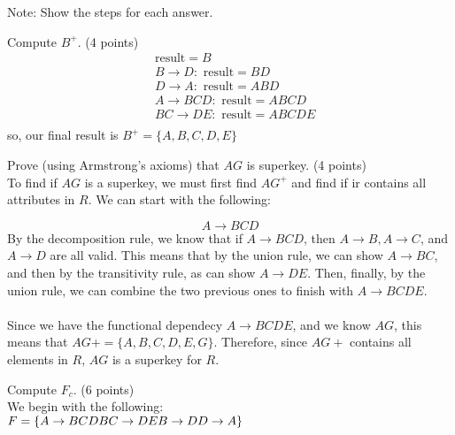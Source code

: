 \documentclass[a4 paper]{article}
\begin{document}
\noindent Note: Show the steps for each answer.

 Compute $B^{+}$. \indent (4 points)\\
\begin{align*}
  &\text{result} = B\\
  &B\rightarrow D: \text{ result} = BD\\
  &D\rightarrow A: \text{ result} = ABD\\
  &A\rightarrow BCD: \text{ result} = ABCD\\
  &BC\rightarrow DE: \text{ result} = ABCDE\\
\end{align*}
so, our final result is $B^+=\{A,B,C,D,E\}$




 Prove (using Armstrong's axioms) that $AG$ is superkey. \indent (4 points)\\
To find if $AG$ is a superkey, we must first find $AG^+$ and find if ir contains all attributes in $R$. We can start with the following:

$$A\rightarrow BCD$$
By the decomposition rule, we know that if $A\rightarrow BCD$, then $A\rightarrow B, A\rightarrow C$, and $A\rightarrow D$ are all valid. This means that by the union rule, we can show $A\rightarrow BC$, and then by the transitivity rule, as can show $A\rightarrow DE$. Then, finally, by the union rule, we can combine the two previous ones to finish with $A\rightarrow BCDE$.\\\\
Since we have the functional dependecy $A\rightarrow BCDE$, and we know $AG$, this means that $AG+=\{A, B, C, D, E, G\}$. Therefore, since $AG+$ contains all elements in $R$, $AG$ is a superkey for $R$.

 Compute $F_{c}$. \indent (6 points)\\

We begin with the following:\\
$F=\{\\
A \rightarrow BCD\\
BC \rightarrow DE\\
B \rightarrow D\\
D \rightarrow A\}$\\
\end{document}
